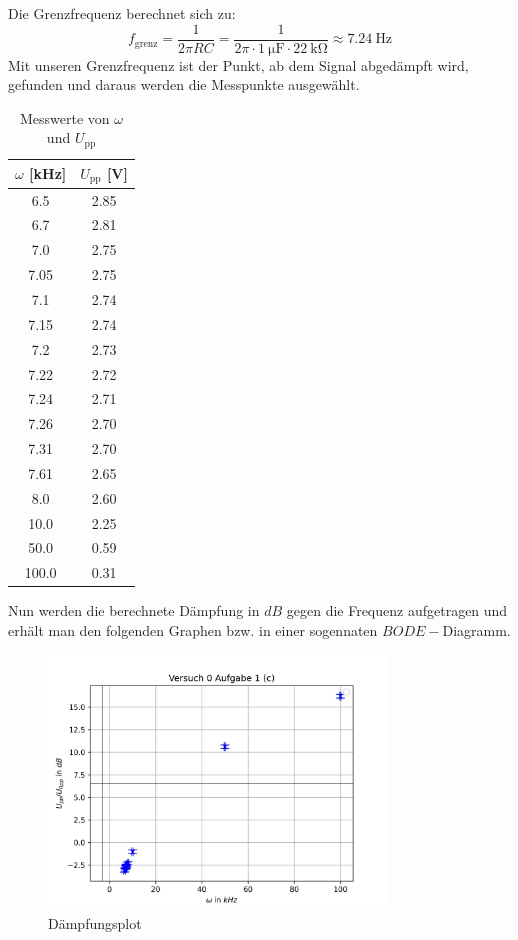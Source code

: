 \documentclass{article}
\begin{document}
\begin{enumerate}[label=\alph*]
         Die Grenzfrequenz berechnet sich zu:
         \[
         f_{\text{grenz}} = \frac{1}{2\pi R C} = \frac{1}{2\pi \cdot \SI{1}{\micro\farad} \cdot \SI{22}{\kilo\ohm}} 
         \approx \SI{7.24}{\hertz}
         \]
         Mit unseren Grenzfrequenz ist der Punkt, ab dem Signal abgedämpft wird, gefunden und daraus 
         werden die Messpunkte ausgewählt. 
         \begin{table}[H]
            \centering
            \begin{tabular}{|c|c|}
            \hline
            $\omega$ [kHz] & $U_{\text{pp}}$ [V] \\
            \hline
            6.5  & 2.85 \\
            6.7  & 2.81 \\
            7.0  & 2.75 \\
            7.05 & 2.75 \\
            7.1  & 2.74 \\
            7.15 & 2.74 \\
            7.2  & 2.73 \\
            7.22 & 2.72 \\
            7.24 & 2.71 \\
            7.26 & 2.70 \\
            7.31 & 2.70 \\
            7.61 & 2.65 \\
            8.0  & 2.60 \\
            10.0 & 2.25 \\
            50.0 & 0.59 \\
            100.0 & 0.31 \\
            \hline
            \end{tabular}
            \caption{Messwerte von $\omega$ und $U_{\text{pp}}$}
            \label{tab:omega_upp}
            \end{table}
            Nun werden die berechnete Dämpfung in $dB$ gegen die Frequenz aufgetragen und erhält man 
            den folgenden Graphen bzw. in einer sogennaten $BODE-$Diagramm. 

         \begin{figure}[H]
             \centering
             \includegraphics[width=0.8\textwidth]{pythonAuswertungen/Versuch 0 Aufgabe 1 (c)_plot.jpg}
             \caption{Dämpfungsplot}
             \label{0_1_(c)_Dämpfung}
         \end{figure}


\end{enumerate}
\end{document}

